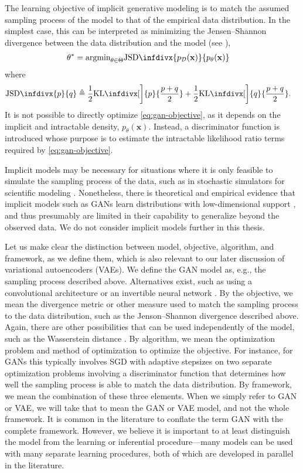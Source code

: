 The learning objective of implicit generative modeling is to match the assumed sampling process of the model to that of the empirical data distribution. In the simplest case, this can be interpreted as minimizing the Jensen--Shannon divergence between the data distribution and the model (see \citep[Theorem 1]{GoodfellowEtAl2014}),
\begin{align}\label{eq:gan-objective}
	\theta^* &= \text{argmin}_{\theta\in\Theta}\text{JSD}\infdivx{p_\mathcal{D}(\mathbf{x})}{p_\theta(\mathbf{x})}
\end{align}
where
\begin{align*}
	\text{JSD}\infdivx{p}{q} &\triangleq \frac{1}{2}\text{KL}\infdivx[\bigg]{p}{\frac{p+q}{2}} + \frac{1}{2}\text{KL}\infdivx[\bigg]{q}{\frac{p+q}{2}}.
\end{align*}
It is not possible to directly optimize \eqref{eq:gan-objective}, as it depends on the implicit and intractable density, $p_\theta(\mathbf{x})$. Instead, a discriminator function is introduced whose purpose is to estimate the intractable likelihood ratio terms required by \eqref{eq:gan-objective}.

Implicit models may be necessary for situations where it is only feasible to simulate the sampling process of the data, such as in stochastic simulators for scientific modeling \citep{van2018introduction}. Nonetheless, there is theoretical and empirical evidence that implicit models such as GANs learn distributions with low-dimensional support \citep{arora2017generalization, arora2017gans}, and thus presumably are limited in their capability to generalize beyond the observed data. We do not consider implicit models further in this thesis.

Let us make clear the distinction between model, objective, algorithm, and framework, as we define them, which is also relevant to our later discussion of variational autoencoders (VAEs). We define the GAN model as, e.g., the sampling process described above. Alternatives exist, such as using a convolutional architecture \citep{radford2015unsupervised} or an invertible neural network \citep{grover2018flow}. By the objective, we mean the divergence metric or other measure used to match the sampling process to the data distribution, such as the Jenson--Shannon divergence described above. Again, there are other possibilities that can be used independently of the model, such as the Wasserstein distance \citep{ArjovskyEtAl2017}. By algorithm, we mean the optimization problem and method of optimization to optimize the objective. For instance, for GANs this typically involves SGD with adaptive stepsizes \citep{KingmaBa2014} on two separate optimization problems involving a discriminator function that determines how well the sampling process is able to match the data distribution. By framework, we mean the combination of these three elements. When we simply refer to GAN or VAE, we will take that to mean the GAN or VAE model, and not the whole framework. It is common in the literature to conflate the term GAN with the complete framework. However, we believe it is important to at least distinguish the model from the learning or inferential procedure---many models can be used with many separate learning procedures, both of which are developed in parallel in the literature.

